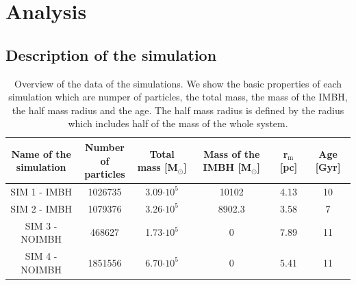 \section{Analysis}

\subsection{Description of the simulation}
\begin{table}[htbp]
\centering
\begin{tabular}{ c | c | c | c | c | c }
\makecell{Name of the \\simulation} & \makecell{Number of \\ particles} & Total mass [M\(_\odot\)]& \makecell{Mass of the \\ \ac{IMBH} [M\(_\odot\)]}& r\(_\mathrm{m}\) [pc] & Age [Gyr]\\
\hline			
  SIM 1 - IMBH & 1026735 & 3.09\(\cdot 10^5\) & 10102 & 4.13 & 10\\
  SIM 2 - IMBH & 1079376& 3.26\(\cdot 10^5\) & 8902.3 & 3.58 & 7\\
  SIM 3 - NOIMBH & 468627& 1.73\(\cdot 10^5\)& 0 & 7.89 & 11\\
  SIM 4 - NOIMBH & 1851556& 6.70\(\cdot 10^5\)& 0 & 5.41 & 11\\

\end{tabular}
\caption{Overview of the data of the simulations. We show the basic properties of each simulation which are numper of particles, the total mass, the mass of the \ac{IMBH}, the half mass radius and the age. The half mass radius is defined by the radius which includes half of the mass of the whole system.}
\label{tab:overview_simulation}
\end{table}

